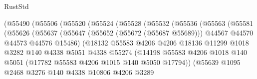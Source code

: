 \begin{lexlean}{RustStd}
\begin{coremodule}
                          (@55490
                            (@55506
                              (@55520
                                (@55524
                                  (@55528
                                    (@55532
                                      (@55536
                                        (@55563
                                          (@55581
                                            (@55626
                                              (@55637
                                                (@55647
                                                  (@55652 (@55672 (@55687 @55689)))
                                                  @44567
                                                  @44570
                                                  @44573
                                                  @44576
                                                  @15486)
                                                (@18132
                                                  @55583
                                                  @4206
                                                  @4206
                                                  @18136
                                                  @11299
                                                  @1018
                                                  @3282
                                                  @140
                                                  @4338
                                                  @5051
                                                  @4338
                                                  @55274
                                                  (@14198
                                                    @55583
                                                    @4206
                                                    @1018
                                                    @140
                                                    @5051
                                                    (@17782 @55583 @4206 @1015 @140 @5050 @17794))
                                                  (@55639
                                                    @1095
                                                    @2468
                                                    @3276
                                                    @140
                                                    @4338
                                                    @10806
                                                    @4206
                                                    @3289

\end{coremodule}
\end{lexlean}
